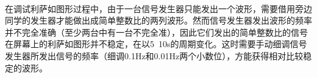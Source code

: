 \documentclass{article} %
\begin{document}
\paragraph{}
在调试利萨如图形过程中，由于一台信号发生器只能发出一个波形，需要借用旁边同学的发生器才能做出成简单整数比的两列波形。然而信号发生器发出波形的频率并不完全准确（至少两台中有一台不完全准），因此它们发出的简单整数比的信号在屏幕上的利萨如图形并不稳定，在以5~10s的周期变化。这时需要手动细调信号发生器所发出信号的频率（细调0.1Hz和0.01Hz两个小数位），方能获得相对比较稳定的波形。
\begin{figure}
\centering
{}
 \\
 \\

\end{figure}
\end{document}
